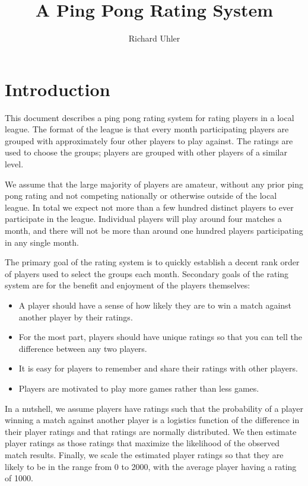 \documentclass{article}
\begin{document}
\title{A Ping Pong Rating System}
\author{Richard Uhler}
\maketitle

\section{Introduction}
This document describes a ping pong rating system for rating players in a
local league. The format of the league is that every month participating
players are grouped with approximately four other players to play against. The
ratings are used to choose the groups; players are grouped with other players
of a similar level.

We assume that the large majority of players are amateur, without any prior
ping pong rating and not competing nationally or otherwise outside of the
local league. In total we expect not more than a few hundred distinct players
to ever participate in the league. Individual players will play around four
matches a month, and there will not be more than around one hundred players
participating in any single month.

The primary goal of the rating system is to quickly establish a decent rank
order of players used to select the groups each month. Secondary goals of the
rating system are for the benefit and enjoyment of the players themselves:
\begin{itemize}
  \item A player should have a sense of how likely they are to win a match
    against another player by their ratings.
  \item For the most part, players should have unique ratings so that you can
    tell the difference between any two players.
  \item It is easy for players to remember and share their ratings with other
    players.
  \item Players are motivated to play more games rather than less games.
\end{itemize}

In a nutshell, we assume players have ratings such that the probability
of a player winning a match against another player is a logistics function of
the difference in their player ratings and that ratings are normally
distributed. We then estimate player ratings as those ratings that maximize
the likelihood of the observed match results. Finally, we scale the estimated
player ratings so that they are likely to be in the range from 0 to 2000, with
the average player having a rating of 1000.
\end{document}
